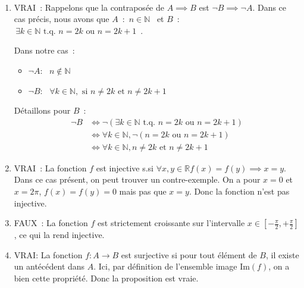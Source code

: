 



\begin{exercice}
\,
\begin{enumerate}
    \item VRAI~: Rappelons que la contraposée de $A \implies B$ est $\neg B \implies \neg A$. Dans ce cas précis, nous avons que $A$~: \guillemotleft $\,n \in \mathbb N$ \guillemotright \, et $B$~: \guillemotleft~$\, \exists k \in \mathbb N \text{ t.q. } n=2k \text { ou } n=2k+1$~\guillemotright.

    Dans notre cas~:

    \begin{itemize}
        \item $\neg A$: \guillemotleft \, $n \not\in \mathbb N$ \guillemotright
        \item $\neg B$: \guillemotleft \, $\forall k \in \mathbb N, \text{ si } n \not= 2k \text { et } n\not= 2k+1$ \guillemotright
    \end{itemize}

    Détaillons pour $B$~:
    \begin{align*}
        \neg B &\iff \neg \left( \exists k \in \mathbb N \text{ t.q. } n=2k \text { ou } n=2k+1 \right) \\
            &\iff \forall k \in \mathbb N, \neg \left( n=2k \text{ ou } n=2k+1 \right) \\
            &\iff \forall k \in \mathbb N, n \not= 2k \text { et } n\not= 2k+1
    \end{align*}

    \item VRAI~: La fonction $f$ est injective s.si $\forall x, y \in \mathbb R f(x) = f(y) \implies x = y$. Dans ce cas présent, on peut trouver un contre-exemple. On a pour $x = 0$ et $x = 2\pi$, $f(x) = f(y) = 0$ mais pas que $x = y$. Donc la fonction n'est pas injective.

    \item FAUX~: La fonction $f$ est strictement croissante sur l'intervalle $x \in \left[-\frac \pi 2, + \frac \pi 2\right]$, ce qui la rend injective.
    
    \item VRAI: La fonction $f: A \rightarrow B$ est surjective si pour tout élément de $B$, il existe un antécédent dans $A$. Ici, par définition de l'ensemble image $\text{Im}(f)$, on a bien cette propriété. Donc la proposition est vraie. \\
\end{enumerate}

\end{exercice}



